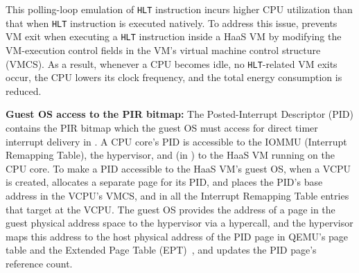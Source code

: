 {This polling-loop emulation of {\tt HLT} instruction incurs higher CPU utilization than that when {\tt HLT} instruction is executed natively. 
To address this issue, \na prevents VM exit when executing a {\tt HLT} instruction inside a HaaS VM by modifying the VM-execution control fields 
in the VM's virtual machine control structure (VMCS).
As a result, whenever a CPU becomes idle, no {\tt HLT}-related VM exits occur, the CPU lowers its clock frequency, and the total energy consumption is reduced. 

}

{\bf Guest OS access to the PIR bitmap:}
The Posted-Interrupt Descriptor (PID) contains the PIR bitmap 
which the guest OS must access for direct timer interrupt delivery in \sna.
A CPU core's PID is accessible to the IOMMU (Interrupt Remapping Table), 
the hypervisor, and (in \sna) to  the HaaS VM running on the CPU core. 
To make a PID accessible to the HaaS VM's guest OS,
when a VCPU is created, \na allocates a separate page for its PID, 
and places the PID's base address in the VCPU's VMCS, and 
in all the Interrupt Remapping Table entries that target at the VCPU.
The guest OS provides the address of a page in the guest physical address 
space to the hypervisor via a hypercall, and the hypervisor maps this address 
to the host physical address of the PID page in QEMU's page table and 
the Extended Page Table (EPT)~\cite{ept-wiki}, and updates the 
PID page's reference count.
   
